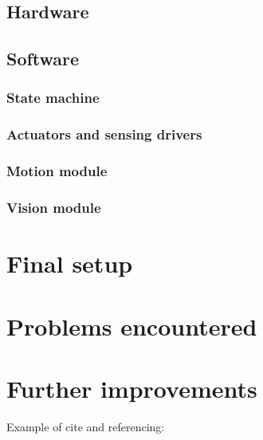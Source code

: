 \documentclass[11pt]{article}
\begin{document}
\subsection{Hardware}
	
	
\subsection{Software}



\subsubsection{State machine}



\subsubsection{Actuators and sensing drivers}


\subsubsection{Motion module}


\subsubsection{Vision module}


\section{ Final setup }


\section{Problems encountered}




\section{Further improvements}




Example of cite and referencing:\cite{craig2005introduction}

\clearpage

\printbibliography
\end{document}
